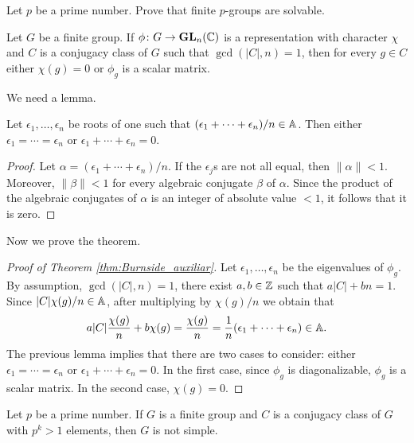 \begin{exercise}
\label{xca:pgroups_solvable}
	Let $p$ be a prime number. Prove that 
	finite $p$-groups are solvable.
\end{exercise}

\begin{theorem}[Burnside]
	\label{thm:Burnside_auxiliar}
	Let $G$ be a finite group. If $\phi\colon G\to\mathbf{GL}_n(\mathbb{C})$ is a representation
	with character $\chi$ and $C$ is a conjugacy class of $G$ such that 
	$\gcd(|C|,n)=1$, then for every $g\in C$ either 
	$\chi(g)=0$ or $\phi_g$ is a scalar matrix. 
\end{theorem}

We need a lemma.

\begin{lemma}
	\label{lem:4Burnside}
	Let $\epsilon_1,\dots,\epsilon_n$ be roots of one such that 
	$(\epsilon_1+\cdots+\epsilon_n)/n\in\mathbb{A}$. Then either 
	$\epsilon_1=\cdots=\epsilon_n$ or 
	$\epsilon_1+\cdots+\epsilon_n=0$.
\end{lemma}

\begin{proof}
	Let $\alpha=(\epsilon_1+\cdots+\epsilon_n)/n$.
	If the $\epsilon_j$s are not all equal, then $\|\alpha\|<1$. Moreover, 
	$\|\beta\|<1$ for every algebraic conjugate $\beta$ of $\alpha$. Since the product 
	of the algebraic conjugates of $\alpha$ is an integer of absolute value 
	$<1$, it follows that it is zero. 
\end{proof}

Now we prove the theorem.

\begin{proof}[Proof of Theorem \ref{thm:Burnside_auxiliar}]
	Let $\epsilon_1,\dots,\epsilon_n$ be the eigenvalues of $\phi_g$. By assumption, 
	$\gcd(|C|,n)=1$, there exist $a,b\in\mathbb{Z}$ such that $a|C|+bn=1$. Since 
	$|C|\chi(g)/n\in\mathbb{A}$, after multiplying by $\chi(g)/n$ we obtain that  
	\[
		a|C|\frac{\chi(g)}{n}+b\chi(g)=\frac{\chi(g)}{n}=\frac{1}{n}(\epsilon_1+\cdots+\epsilon_n)\in\mathbb{A}.
	\]
	The previous lemma implies that there are two cases to consider: 
	either $\epsilon_1=\cdots=\epsilon_n$ or $\epsilon_1+\cdots+\epsilon_n=0$. In the first
	case, since $\phi_g$ is diagonalizable, $\phi_g$ is a scalar matrix. 
	In the second case, $\chi(g)=0$.
\end{proof}

\begin{theorem}[Burnside]
	Let $p$ be a prime number. If $G$ is a finite group and 
	$C$ is a conjugacy class of $G$ with $p^k>1$ elements, then $G$ 
	is not simple.
\end{theorem}

